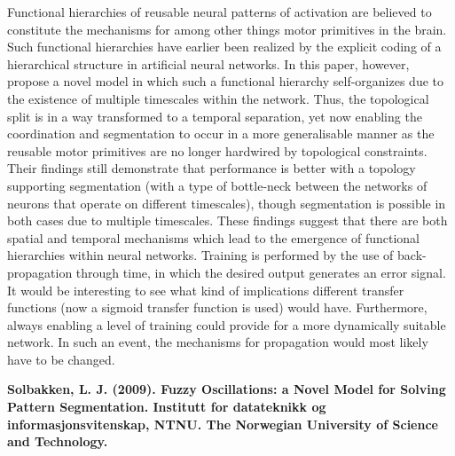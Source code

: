 Functional hierarchies of reusable neural patterns of activation are believed to constitute the mechanisms for among other things motor primitives in the brain. Such functional hierarchies have earlier been realized by the explicit coding of a hierarchical structure in artificial neural networks. In this paper, however, \cite{Yamashita2008} propose a novel model in which such a functional hierarchy self-organizes due to the existence of multiple timescales within the network. Thus, the topological split is in a way transformed to a temporal separation, yet now enabling the coordination and segmentation to occur in a more generalisable manner as the reusable motor primitives are no longer hardwired by topological constraints. Their findings still demonstrate that performance is better with a topology supporting segmentation (with a type of bottle-neck between the networks of neurons that operate on different timescales), though segmentation is possible in both cases due to multiple timescales. These findings suggest that there are both spatial and temporal mechanisms which lead to the emergence of functional hierarchies within neural networks. Training is performed by the use of back-propagation through time, in which the desired output generates an error signal. It would be interesting to see what kind of implications different transfer functions (now a sigmoid transfer function is used) would have. Furthermore, always enabling a level of training could provide for a more dynamically suitable network. In such an event, the mechanisms for propagation would most likely have to be changed.


\textbf{Solbakken, L. J. (2009). Fuzzy Oscillations: a Novel Model for Solving Pattern Segmentation. Institutt for datateknikk og informasjonsvitenskap, NTNU. The Norwegian University of Science and Technology.}

